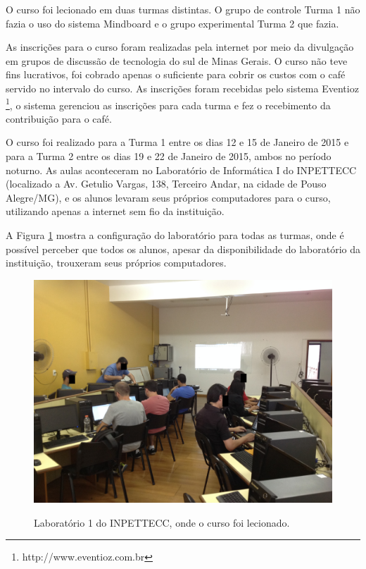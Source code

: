 O curso foi lecionado em duas turmas distintas. O grupo de controle Turma 1 não fazia o uso do sistema Mindboard e o grupo experimental Turma 2 que fazia.

As inscrições para o curso foram realizadas pela internet por meio da divulgação em grupos de discussão de tecnologia do sul de Minas Gerais. O curso não teve fins lucrativos, foi cobrado apenas o suficiente para cobrir os custos com o café servido no intervalo do curso. As inscrições foram recebidas pelo sistema Eventioz \footnote{http://www.eventioz.com.br}, o sistema gerenciou as inscrições para cada turma e fez o recebimento da contribuição para o café.

O curso foi realizado para a Turma 1 entre os dias 12 e 15 de Janeiro de 2015 e para a Turma 2 entre os dias 19 e 22 de Janeiro de 2015, ambos no período noturno.  As aulas aconteceram no Laboratório de Informática I do INPETTECC (localizado a Av. Getulio Vargas, 138, Terceiro Andar, na cidade de Pouso Alegre/MG), e os alunos levaram seus próprios computadores para o curso, utilizando apenas a internet sem fio da instituição.

A Figura \ref{fig:lab_1} mostra a configuração do laboratório para todas as turmas, onde é possível perceber que todos os alunos, apesar da disponibilidade do laboratório da instituição, trouxeram seus próprios computadores.

\begin{figure}[!h]
\centering
\caption{Laboratório 1 do INPETTECC, onde o curso foi lecionado.}
\includegraphics[width=1.0\textwidth]{imgs/lab_1.jpg}
\label{fig:lab_1} 
\end{figure}

